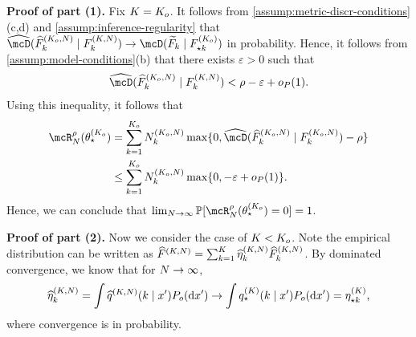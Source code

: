 \textbf{Proof of part (1).} %
Fix $K=K_{o}$.
It follows from \cref{assump:metric-discr-conditions}(c,d) and \cref{assump:inference-regularity} that $\discrest{\widehat{F}^{(\numcomps_{o},\numobs)}_{k}}{F^{(\numcomps,\numobs)}_{k} }  \to \discr{\widetilde{F}_{k}}{F^{(\numcomps_{o})}_{\opt k}}$ in probability.
Hence, it follows from \cref{assump:model-conditions}(b) that there exists $\varepsilon>0$ such that
\[
	\discrest{\widehat{F}^{(\numcomps_{o},\numobs)}_{k}}{F^{(\numcomps,\numobs)}_{k} } < \rho - \varepsilon + \op(1).
\]
Using this inequality, it follows that
\begin{align}
	\mcR^{\rho}_{\numobs}(\allparam^{(\numcomps_o}_{\star})
	 & =\sum_{k=1}^{\numcomps_o}	N^{(\numcomps_{o},\numobs)}_k \max\{0, \discrest{\widehat{F}_{k}^{(\numcomps_o, \numobs)}}{F^{(\numcomps_{o},\numobs)}_{k}}  - \rho\} \\
	 & \le \sum_{k=1}^{\numcomps_o}	N^{(\numcomps_{o},\numobs)}_k\max\{0, -\varepsilon+\op(1)\}.
\end{align}
Hence, we can conclude that $\lim_{\numobs \rightarrow\infty}\Pr[ \mcR^{\rho}_{\numobs}(\allparam^{(\numcomps_o}_{\star}) =0] = 1$. %

\textbf{Proof of part (2).}
Now we consider the case of $K < K_o$.
Note the empirical distribution can be written as $\widehat{F}^{(K, N)} = \sum_{k=1}^{K}\widehat{\eta}_k^{(K, N)} \widehat{F}_k^{(K, N)}$.
By dominated convergence, we know that for $N \to \infty$,
\begin{equation}
	\widehat{\eta}_k^{(\numcomps,\numobs)} = \int \widehat{q}^{(\numcomps,\numobs)} (k\mid x')\datadist(\dee x') \rightarrow  \int q^{(\numcomps)}_{\star}(k\mid x')\datadist(\dee x') = \eta^{(\numcomps)}_{\star k}, \label{eq:pi-conv}
\end{equation}
where convergence is in probability.

